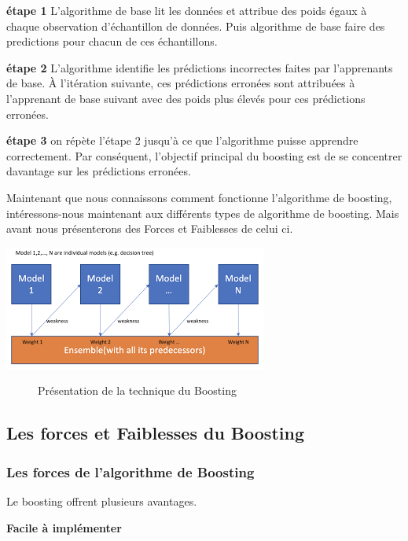 \documentclass[french,a4paper,12pt]{article}
\begin{document}
\textbf{étape 1}
 \quad L'algorithme de base lit les données et attribue des poids égaux à chaque observation d'échantillon de données. Puis algorithme de base faire des predictions pour chacun de ces échantillons.
 
 \textbf{étape 2}
 \quad L’algorithme identifie les prédictions incorrectes faites par l'apprenants de base. À l'itération suivante, ces prédictions erronées sont attribuées à l'apprenant de base suivant avec des poids plus élevés pour ces prédictions erronées.

 
 \textbf{étape 3}
\quad on répète l'étape 2 jusqu'à ce que l'algorithme puisse apprendre correctement.
Par conséquent, l'objectif principal du boosting est de se concentrer davantage sur les prédictions erronées.

\quad Maintenant que nous connaissons comment fonctionne l’algorithme de boosting, intéressons-nous maintenant aux différents types de algorithme de boosting. Mais avant nous présenterons des Forces  et Faiblesses de celui ci.



 \begin{center}
\includegraphics[scale=1]{boosting definition.png}
\begin{figure}[h]
\caption{Présentation de la technique du Boosting}
\end{figure}
\end{center}
\subsection{Les forces et Faiblesses du Boosting}


\subsubsection{ Les forces de l'algorithme de Boosting}

\quad Le boosting offrent plusieurs avantages.



\textbf{ Facile à implémenter }
\end{document}
